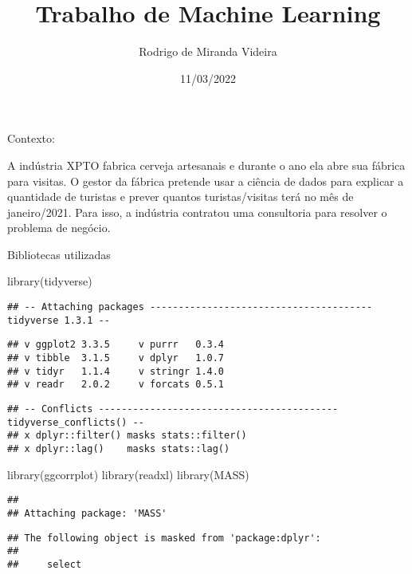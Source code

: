 \documentclass[
]{article}
\title{Trabalho de Machine Learning}
\author{Rodrigo de Miranda Videira}
\date{11/03/2022}
\newenvironment{Shaded}{\begin{snugshade}}{\end{snugshade}}
\newcommand{\FunctionTok}[1]{\textcolor[rgb]{0.00,0.00,0.00}{#1}}
\newcommand{\NormalTok}[1]{#1}
\begin{document}
\maketitle

Contexto:

A indústria XPTO fabrica cerveja artesanais e durante o ano ela abre sua
fábrica para visitas. O gestor da fábrica pretende usar a ciência de
dados para explicar a quantidade de turistas e prever quantos
turistas/visitas terá no mês de janeiro/2021. Para isso, a indústria
contratou uma consultoria para resolver o problema de negócio.

Bibliotecas utilizadas

\begin{Shaded}
\begin{Highlighting}[]
\FunctionTok{library}\NormalTok{(tidyverse)}
\end{Highlighting}
\end{Shaded}

\begin{verbatim}
## -- Attaching packages --------------------------------------- tidyverse 1.3.1 --
\end{verbatim}

\begin{verbatim}
## v ggplot2 3.3.5     v purrr   0.3.4
## v tibble  3.1.5     v dplyr   1.0.7
## v tidyr   1.1.4     v stringr 1.4.0
## v readr   2.0.2     v forcats 0.5.1
\end{verbatim}

\begin{verbatim}
## -- Conflicts ------------------------------------------ tidyverse_conflicts() --
## x dplyr::filter() masks stats::filter()
## x dplyr::lag()    masks stats::lag()
\end{verbatim}

\begin{Shaded}
\begin{Highlighting}[]
\FunctionTok{library}\NormalTok{(ggcorrplot)}
\FunctionTok{library}\NormalTok{(readxl)}
\FunctionTok{library}\NormalTok{(MASS)}
\end{Highlighting}
\end{Shaded}

\begin{verbatim}
## 
## Attaching package: 'MASS'
\end{verbatim}

\begin{verbatim}
## The following object is masked from 'package:dplyr':
## 
##     select
\end{verbatim}
\end{document}
